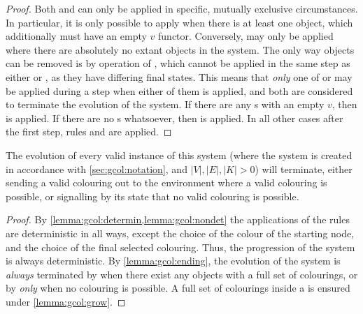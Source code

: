 \begin{proof}
Both  and  can only be applied in specific, mutually exclusive circumstances.  In particular, it is only possible to apply  when there is at least one \bo{} object, which additionally must have an empty \(v\) functor.  Conversely,  may only be applied where there are absolutely no extant \bo{} objects in the system.  The only way \bo{} objects can be removed is by operation of , which cannot be applied in the same step as either  or , as they have differing final states.  This means that \emph{only} one of  or  may be applied during a step when either of them is applied, and both are considered to terminate the evolution of the system.  If there are any \bo{}s with an empty \(v\), then  is applied.  If there are no \bo{}s whatsoever, then  is applied.  In all other cases after the first step, rules  and  are applied.
\end{proof}

\begin{theorem}
The evolution of every valid instance of this system (where the system is created in accordance with \cref{sec:gcol:notation}, and \(|V|, |E|, |K| > 0\)) will terminate, either sending a valid colouring out to the environment where a valid colouring is possible, or signalling by its state that no valid colouring is possible.
\end{theorem}

\begin{proof}
By \cref{lemma:gcol:determin,lemma:gcol:nondet} the applications of the rules are deterministic in all ways, except the choice of the colour of the starting node, and the choice of the final selected colouring.  Thus, the progression of the system is always deterministic.  By \cref{lemma:gcol:ending}, the evolution of the system is \emph{always} terminated by  when there exist any \bo{} objects with a full set of colourings, or by  \emph{only} when no colouring is possible.  A full set of colourings inside a \bo{} is ensured under \cref{lemma:gcol:grow}.
\end{proof}

